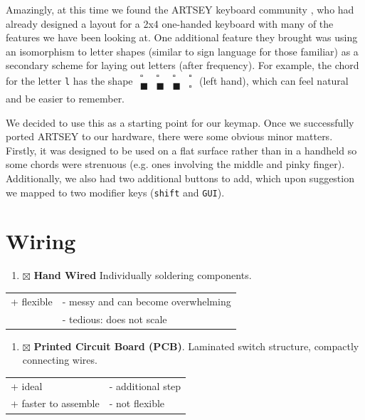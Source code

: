 \documentclass[logo,bsc,singlespacing,parskip]{infthesis}
\begin{document}
Amazingly, at this time we found the ARTSEY keyboard community \autocite{ARTSEYEasyFast}, who had already designed a layout for a 2x4 one-handed keyboard with many of the features we have been looking at.
One additional feature they brought was using an isomorphism to letter shapes (similar to sign language for those familiar) as a secondary scheme for laying out letters (after frequency).
For example, the chord for the letter \texttt{l} has the shape \(\begin{matrix} \square & \square  & \square  & \square \\ \blacksquare &  \blacksquare & \blacksquare & \square \end{matrix}\) (left hand), which can feel natural and be easier to remember.

We decided to use this as a starting point for our keymap.
Once we successfully ported ARTSEY to our hardware, there were some obvious minor matters.
Firstly, it was designed to be used on a flat surface rather than in a handheld so some chords were strenuous (e.g. ones involving the middle and pinky finger).
Additionally, we also had two additional buttons to add, which upon suggestion we mapped to two modifier keys (\texttt{shift} and \texttt{GUI}).
\section{Wiring}
\label{sec:org5070d97}
\begin{enumerate}
\item{$\boxtimes$} \textbf{Hand Wired} Individually soldering components.
\end{enumerate}
\begin{longtable}{|p{6.25cm}|p{6.25cm}|}
\hline
+ flexible & - messy and can become overwhelming\\
 & - tedious: does not scale\\
\hline
\end{longtable}
\begin{enumerate}
\item{$\boxtimes$} \textbf{Printed Circuit Board (PCB)}. Laminated switch structure, compactly connecting wires.
\end{enumerate}
\begin{longtable}{|p{6.25cm}|p{6.25cm}|}
\hline
+ ideal & - additional step\\
+ faster to assemble & - not flexible\\
\hline
\end{longtable}
\end{document}
